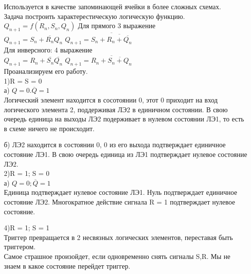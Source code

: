 Используется в качестве запоминающей ячейки в более сложных схемах.\\
Задача построить характерестическую логическую функцию.\\
$Q_{n+1} = f(R_n , S_n, Q_n)$
Для прямого  3 выражение\\
$Q_{n+1} = S_n + \overline{R_n} Q_n$
$Q_{n+1} = \overline {S_n + \overline{R_n + \overline{Q_n}}} $\\

Для инверсного:  4  выражение\\
$Q_{n+1} = R_n + \overline{S_n} \overline{ Q_n}$
$Q_{n+1} = \overline {R_n + \overline{S_n + Q_n}} $\\

Проанализируем его работу.\\

1)R = S = 0\\
а) $Q = 0 . \overline{Q} = 1 $\\
Логический элемент находится в сосотоянии 0, этот 0 приходит на вход логического элемента 2, поддерживая ЛЭ2 в единичном состоянии.
В свою очередь единица на выходы ЛЭ2 подерживает в нулевом состоянии ЛЭ1, то есть в схеме ничего не происходит.

б)
ЛЭ2 находится в состоянии 0, 0 из его выхода подтверждает единичное состояние ЛЭ1.
В свою очередь единица из ЛЭ1 подтверждает нулевое состояние ЛЭ2.\\


2)R = 1; S = 0\\
а) $Q = 0;  \overline{Q} = 1 $\\
Единица подтверждает нулевое состояние ЛЭ1. Нуль подтверждает единичное состояние ЛЭ2.
Многократное действие сигнала R = 1 подтверждает нулевое состояние.

4)R = 1; S = 1\\
Триггер превращается в 2 несвязных логических элементов, переставая быть триггером.\\

Самое страшное произойдет, если одновременно снять сигналы S,R. Мы не знаем в какое состояние перейдет триггер.\\
